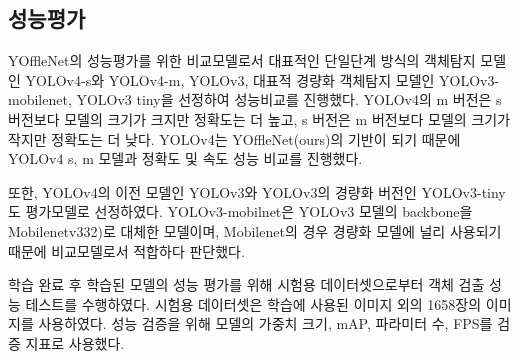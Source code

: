 \documentclass[10pt,twocolumn,letterpaper]{article}
\begin{document}
\vspace{.25cm}
\subsection{성능평가}
YOffleNet의 성능평가를 위한 비교모델로서 대표적인 단일단계 방식의 객체탐지 모델인 YOLOv4-s와 YOLOv4-m, YOLOv3, 대표적 경량화 객체탐지 모델인 YOLOv3-mobilenet, YOLOv3 tiny을 선정하여 성능비교를 진행했다. YOLOv4의 m 버전은 s 버전보다 모델의 크기가 크지만 정확도는 더 높고, s 버전은 m 버전보다 모델의 크기가 작지만 정확도는 더 낮다. YOLOv4는 YOffleNet(ours)의 기반이 되기 때문에 YOLOv4 s, m 모델과 정확도 및 속도 성능 비교를 진행했다.

또한, YOLOv4의 이전 모델인 YOLOv3와 YOLOv3의 경량화 버전인 YOLOv3-tiny도 평가모델로 선정하였다. YOLOv3-mobilnet은 YOLOv3 모델의 backbone을 Mobilenetv332)로 대체한 모델이며, Mobilenet의 경우 경량화 모델에 널리 사용되기 때문에 비교모델로서 적합하다 판단했다.

학습 완료 후 학습된 모델의 성능 평가를 위해 시험용 데이터셋으로부터 객체 검출 성능 테스트를 수행하였다. 시험용 데이터셋은 학습에 사용된 이미지 외의 1658장의 이미지를 사용하였다. 성능 검증을 위해 모델의 가중치 크기, mAP, 파라미터 수, FPS를 검증 지표로 사용했다.
\end{document}
